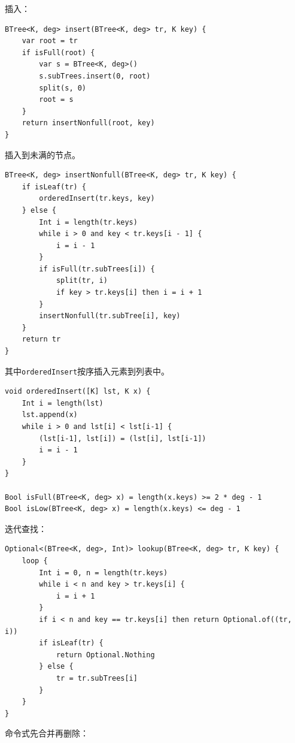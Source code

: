 \documentclass[b5paper]{ctexart}
\begin{document}
插入：

\begin{lstlisting}[language = Bourbaki]
BTree<K, deg> insert(BTree<K, deg> tr, K key) {
    var root = tr
    if isFull(root) {
        var s = BTree<K, deg>()
        s.subTrees.insert(0, root)
        split(s, 0)
        root = s
    }
    return insertNonfull(root, key)
}
\end{lstlisting}

插入到未满的节点。

\begin{lstlisting}[language = Bourbaki]
BTree<K, deg> insertNonfull(BTree<K, deg> tr, K key) {
    if isLeaf(tr) {
        orderedInsert(tr.keys, key)
    } else {
        Int i = length(tr.keys)
        while i > 0 and key < tr.keys[i - 1] {
            i = i - 1
        }
        if isFull(tr.subTrees[i]) {
            split(tr, i)
            if key > tr.keys[i] then i = i + 1
        }
        insertNonfull(tr.subTree[i], key)
    }
    return tr
}
\end{lstlisting}

其中\texttt{orderedInsert}按序插入元素到列表中。

\begin{lstlisting}[language = Bourbaki]
void orderedInsert([K] lst, K x) {
    Int i = length(lst)
    lst.append(x)
    while i > 0 and lst[i] < lst[i-1] {
        (lst[i-1], lst[i]) = (lst[i], lst[i-1])
        i = i - 1
    }
}

Bool isFull(BTree<K, deg> x) = length(x.keys) >= 2 * deg - 1
Bool isLow(BTree<K, deg> x) = length(x.keys) <= deg - 1
\end{lstlisting}

迭代查找：

\begin{lstlisting}[language = Bourbaki]
Optional<(BTree<K, deg>, Int)> lookup(BTree<K, deg> tr, K key) {
    loop {
        Int i = 0, n = length(tr.keys)
        while i < n and key > tr.keys[i] {
            i = i + 1
        }
        if i < n and key == tr.keys[i] then return Optional.of((tr, i))
        if isLeaf(tr) {
            return Optional.Nothing
        } else {
            tr = tr.subTrees[i]
        }
    }
}
\end{lstlisting}

命令式先合并再删除：
\end{document}
